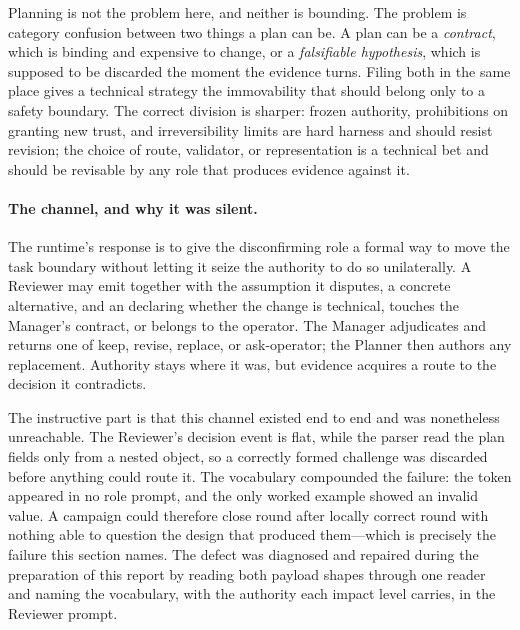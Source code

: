 Planning is not the problem here, and neither is bounding. The problem is category
confusion between two things a plan can be. A plan can be a \emph{contract}, which is
binding and expensive to change, or a \emph{falsifiable hypothesis}, which is
supposed to be discarded the moment the evidence turns. Filing both in the same place
gives a technical strategy the immovability that should belong only to a safety
boundary. The correct division is sharper: frozen authority, prohibitions on granting
new trust, and irreversibility limits are hard harness and should resist revision;
the choice of route, validator, or representation is a technical bet and should be
revisable by any role that produces evidence against it.

\paragraph{The channel, and why it was silent.}
The runtime's response is to give the disconfirming role a formal way to move the
task boundary without letting it seize the authority to do so unilaterally. A
Reviewer may emit  together with the assumption it
disputes, a concrete alternative, and an  declaring whether
the change is technical, touches the Manager's contract, or belongs to the operator.
The Manager adjudicates and returns one of keep, revise, replace, or ask-operator;
the Planner then authors any replacement. Authority stays where it was, but evidence
acquires a route to the decision it contradicts.

The instructive part is that this channel existed end to end and was nonetheless
unreachable. The Reviewer's decision event is flat, while the parser read the plan
fields only from a nested object, so a correctly formed challenge was discarded
before anything could route it. The vocabulary compounded the failure: the token
 appeared in no role prompt, and the only worked example showed an
invalid value. A campaign could therefore close round after locally correct round
with nothing able to question the design that produced them---which is precisely the
failure this section names. The defect was diagnosed and repaired during the
preparation of this report by reading both payload shapes through one reader and
naming the vocabulary, with the authority each impact level carries, in the Reviewer
prompt.

